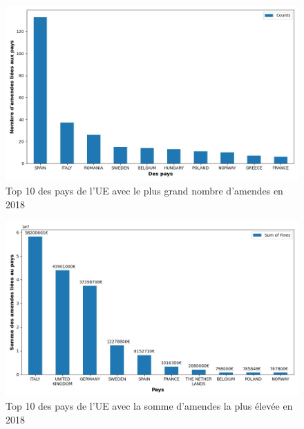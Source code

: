 \documentclass[french]{article}
\begin{document}
	\begin{figure}
		[H]\centering\includegraphics[scale=.5]{graphs/top10_countries_year}
		\caption{Top 10 des pays de l'UE avec le plus grand nombre d'amendes en 2018}
	\end{figure}
	\begin{figure}
		[H]\centering\includegraphics[scale=.5]{graphs/top10_countries_year_fines}
		\caption{Top 10 des pays de l'UE avec la somme d'amendes la plus élevée en 2018}
	\end{figure}
\end{document}
